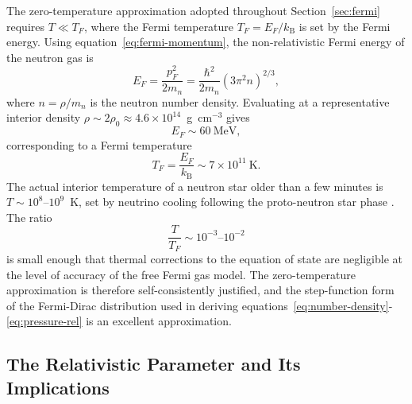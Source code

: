 The zero-temperature approximation adopted throughout Section~\ref{sec:fermi}
requires $T \ll T_F$, where the Fermi temperature $T_F = E_F/k_{\mathrm{B}}$
is set by the Fermi energy. Using equation~\eqref{eq:fermi-momentum},
the non-relativistic Fermi energy of the neutron gas is
%
\begin{equation}
    E_F = \frac{p_F^2}{2m_n}
        = \frac{\hbar^2}{2m_n}
          \left(3\pi^2 n\right)^{2/3},
    \label{eq:fermi-energy}
\end{equation}
%
where $n = \rho / m_n$ is the neutron number density. Evaluating at a
representative interior density $\rho \sim 2\rho_0 \approx
4.6 \times 10^{14}$~g~cm$^{-3}$ gives
%
\begin{equation}
    E_F \sim 60~\text{MeV},
    \label{eq:fermi-energy-numerical}
\end{equation}
%
corresponding to a Fermi temperature
%
\begin{equation}
    T_F = \frac{E_F}{k_{\mathrm{B}}} \sim 7 \times 10^{11}~\text{K}.
    \label{eq:fermi-temperature}
\end{equation}
%
The actual interior temperature of a neutron star older than a few
minutes is $T \sim 10^8$--$10^9$~K, set by neutrino cooling following
the proto-neutron star phase \cite{LattimerPrakash2004}. The ratio
%
\begin{equation}
    \frac{T}{T_F} \sim 10^{-3}\text{--}10^{-2}
    \label{eq:degeneracy-ratio}
\end{equation}
%
is small enough that thermal corrections to the equation of state are
negligible at the level of accuracy of the free Fermi gas model. The
zero-temperature approximation is therefore self-consistently justified,
and the step-function form of the Fermi-Dirac distribution used in
deriving equations~\eqref{eq:number-density}-\eqref{eq:pressure-rel}
is an excellent approximation.
 
\subsection{The Relativistic Parameter and Its Implications}
 
